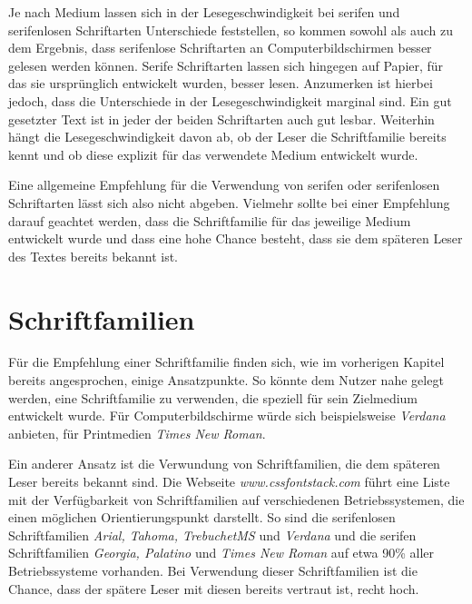Je nach Medium lassen sich in der Lesegeschwindigkeit bei serifen und serifenlosen Schriftarten Unterschiede feststellen, so kommen sowohl \cite{josephson2008keeping} als auch \cite{dogusoy2016serif} zu dem Ergebnis, dass serifenlose Schriftarten an Computerbildschirmen besser gelesen werden können. Serife Schriftarten lassen sich hingegen auf Papier, für das sie ursprünglich entwickelt wurden, besser lesen.
Anzumerken ist hierbei jedoch, dass die Unterschiede in der Lesegeschwindigkeit marginal sind. Ein gut gesetzter Text ist in jeder der beiden Schriftarten auch gut lesbar.
Weiterhin hängt die Lesegeschwindigkeit davon ab, ob der Leser die Schriftfamilie bereits kennt und ob diese explizit für das verwendete Medium entwickelt wurde. \cite{josephson2008keeping}

Eine allgemeine Empfehlung für die Verwendung von serifen oder serifenlosen Schriftarten lässt sich also nicht abgeben. Vielmehr sollte bei einer Empfehlung darauf geachtet werden, dass die Schriftfamilie für das jeweilige Medium entwickelt wurde und dass eine hohe Chance besteht, dass sie dem späteren Leser des Textes bereits bekannt ist.



\section{Schriftfamilien}
Für die Empfehlung einer Schriftfamilie finden sich, wie im vorherigen Kapitel bereits angesprochen, einige Ansatzpunkte. 
So könnte dem Nutzer nahe gelegt werden, eine Schriftfamilie zu verwenden, die speziell für sein Zielmedium entwickelt wurde. Für Computerbildschirme würde sich beispielsweise \textit{Verdana} anbieten, für Printmedien \textit{Times New Roman}.

Ein anderer Ansatz ist die Verwundung von Schriftfamilien, die dem späteren Leser bereits bekannt sind. Die Webseite \textit{www.cssfontstack.com} \cite{cssfontstack} führt eine Liste mit der Verfügbarkeit von Schriftfamilien auf verschiedenen Betriebssystemen, die einen möglichen Orientierungspunkt darstellt. So sind die serifenlosen Schriftfamilien \textit{Arial, Tahoma, TrebuchetMS} und \textit{Verdana} und die serifen Schriftfamilien \textit{Georgia, Palatino} und \textit{Times New Roman} auf etwa 90\% aller Betriebssysteme vorhanden.
Bei Verwendung dieser Schriftfamilien ist die Chance, dass der spätere Leser mit diesen bereits vertraut ist, recht hoch.


